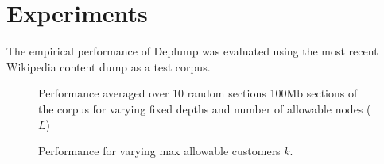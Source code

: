 \section{Experiments}
\label{sec:experiments}

The empirical performance of Deplump was evaluated using the most recent Wikipedia content dump as a test corpus.  

\begin{figure}[t] 
	\begin{center}
		\caption{Performance averaged over 10 random sections  100Mb sections of the corpus for varying fixed depths and number of allowable nodes ($L$) }
		\label{fig:varying_depths}
	\end{center} 
\end{figure} 

\begin{figure}[t] 
	\begin{center}
		\caption{Performance for varying max allowable customers $k$.}
		\label{fig: varying_max_customers}
	\end{center} 
\end{figure} 

